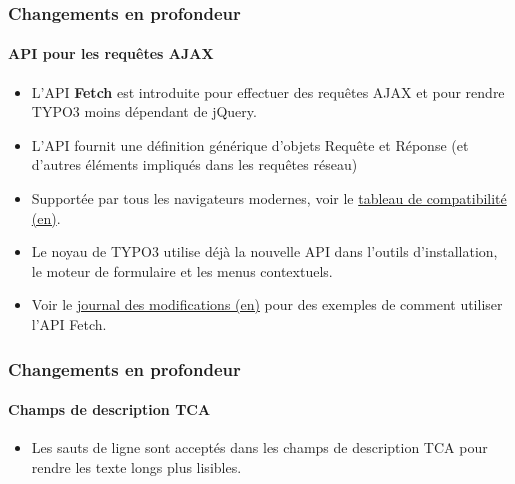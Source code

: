 
\begin{frame}[fragile]
	\frametitle{Changements en profondeur}
	\framesubtitle{API pour les requêtes AJAX}

	\lstset{basicstyle=\tiny\ttfamily}

	\begin{itemize}
		\item L'API \textbf{Fetch} est introduite pour effectuer des requêtes AJAX
			et pour rendre TYPO3 moins dépendant de jQuery.
		\item L'API fournit une définition générique d'objets Requête et Réponse
			(et d'autres éléments impliqués dans les requêtes réseau)
		\item Supportée par tous les navigateurs modernes, voir le
			\href{https://developer.mozilla.org/en-US/docs/Web/API/Fetch_API}{tableau de compatibilité (en)}.
		\item Le noyau de TYPO3 utilise déjà la nouvelle API dans l'outils d'installation, le moteur de
			formulaire et les menus contextuels.
		\item Voir le
			\href{https://docs.typo3.org/c/typo3/cms-core/master/en-us/Changelog/10.3/Feature-89738-ApiForAjaxRequests.html}{journal des modifications (en)}
			pour des exemples de comment utiliser l'API Fetch.

	\end{itemize}

\end{frame}


\begin{frame}[fragile]
	\frametitle{Changements en profondeur}
	\framesubtitle{Champs de description TCA}

	\begin{itemize}
		\item Les sauts de ligne sont acceptés dans les champs de description TCA
			pour rendre les texte longs plus lisibles.
	\end{itemize}

\end{frame}


